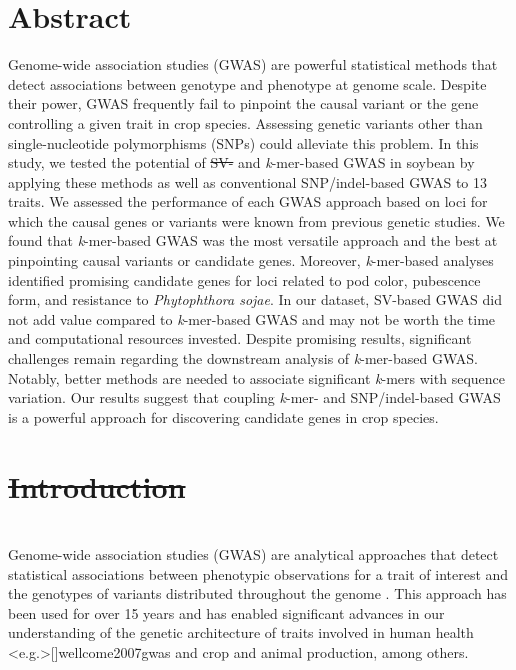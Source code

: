 \documentclass{article}
\providecommand{\DIFaddtex}[1]{{\protect\color{blue}\uwave{#1}}} %
\providecommand{\DIFdeltex}[1]{{\protect\color{red}\sout{#1}}}                      %
\providecommand{\DIFaddbegin}{} %
\providecommand{\DIFaddend}{} %
\providecommand{\DIFdelbegin}{} %
\providecommand{\DIFdelend}{} %
\providecommand{\DIFadd}[1]{\texorpdfstring{\DIFaddtex{#1}}{#1}} %
\providecommand{\DIFdel}[1]{\texorpdfstring{\DIFdeltex{#1}}{}} %
\newcommand{\DIFscaledelfig}{0.5}
\newlength{\DIFdelgraphicswidth} %
\newlength{\DIFdelgraphicsheight} %
\newcommand{\DIFaddincludegraphics}[2][]{{\color{blue}\fbox{\DIFOincludegraphics[#1]{#2}}}} %
\newcommand{\DIFdelincludegraphics}[2][]{%
\sbox{\DIFdelgraphicsbox}{\DIFOincludegraphics[#1]{#2}}%
\settoboxwidth{\DIFdelgraphicswidth}{\DIFdelgraphicsbox} %
\settoboxtotalheight{\DIFdelgraphicsheight}{\DIFdelgraphicsbox} %
\scalebox{\DIFscaledelfig}{%
\parbox[b]{\DIFdelgraphicswidth}{\usebox{\DIFdelgraphicsbox}\\[-\baselineskip] \rule{\DIFdelgraphicswidth}{0em}}\llap{\resizebox{\DIFdelgraphicswidth}{\DIFdelgraphicsheight}{%
\setlength{\unitlength}{\DIFdelgraphicswidth}%
\begin{picture}(1,1)%
\thicklines\linethickness{2pt} %
{\color[rgb]{1,0,0}\put(0,0){\framebox(1,1){}}}%
{\color[rgb]{1,0,0}\put(0,0){\line( 1,1){1}}}%
{\color[rgb]{1,0,0}\put(0,1){\line(1,-1){1}}}%
\end{picture}%
}\hspace*{3pt}}} %
} %
\DeclareRobustCommand{\DIFaddbegin}{\DIFOaddbegin \let\includegraphics\DIFaddincludegraphics} %
\DeclareRobustCommand{\DIFaddend}{\DIFOaddend \let\includegraphics\DIFOincludegraphics} %
\DeclareRobustCommand{\DIFdelbegin}{\DIFOdelbegin \let\includegraphics\DIFdelincludegraphics} %
\DeclareRobustCommand{\DIFdelend}{\DIFOaddend \let\includegraphics\DIFOincludegraphics} %
\begin{document}
\section*{Abstract}

Genome-wide association studies (GWAS) are powerful statistical methods that
detect associations between genotype and phenotype at genome scale. Despite
their power, GWAS frequently fail to pinpoint the causal variant or the gene
controlling a given trait in crop species. Assessing genetic variants other than
single-nucleotide polymorphisms (SNPs) could alleviate this problem.  In this
study, we tested the potential of \DIFdelbegin \DIFdel{SV- }\DIFdelend \DIFaddbegin \DIFadd{structural variant (SV)- }\DIFaddend and \emph{k}-mer-based GWAS in soybean by
applying these methods as well as conventional SNP/indel-based GWAS to 13
traits. We assessed the performance of each GWAS approach based on loci for
which the causal genes or variants were known from previous genetic studies. We
found that \emph{k}-mer-based GWAS was the most versatile approach and the best
at pinpointing causal variants or candidate genes.  Moreover,
\textit{k}-mer-based analyses identified promising candidate genes for loci
related to pod color, pubescence form, and resistance to \textit{Phytophthora
sojae}. In our dataset, SV-based GWAS did not add value compared to
\textit{k}-mer-based GWAS and may not be worth the time and computational
resources invested.  Despite promising results, significant challenges remain
regarding the downstream analysis of \emph{k}-mer-based GWAS.  Notably, better
methods are needed to associate significant \emph{k}-mers with sequence
variation. Our results suggest that coupling \emph{k}-mer- and SNP/indel-based
GWAS is a powerful approach for discovering candidate genes in crop species.

\clearpage

\DIFdelbegin \section*{\DIFdel{Introduction}}
\DIFdelend \DIFaddbegin \section{\DIFadd{Introduction}}
\DIFaddend Genome-wide association studies (GWAS) are analytical approaches that detect
statistical associations between phenotypic observations for a trait of
interest and the genotypes of variants distributed throughout the
genome . This approach has been used for over 15 years
 and has enabled significant advances in our understanding
of the genetic architecture of traits involved in human health
\shortcite<e.g.>[]{wellcome2007gwas} and crop  and animal
 production, among others.
\end{document}
